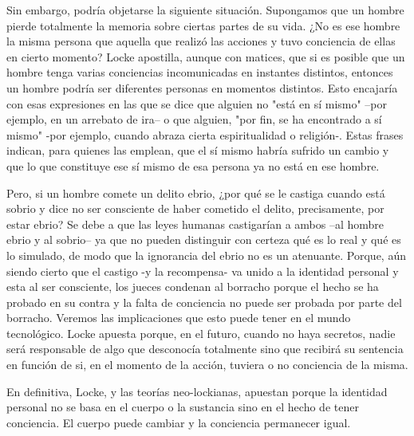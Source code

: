 \documentclass[main.tex]{subfiles}
\begin{document}
	
	Sin embargo, podría objetarse la siguiente situación. Supongamos que un hombre pierde totalmente la memoria sobre ciertas partes de su vida. ¿No es ese hombre la misma persona que aquella que realizó las acciones y tuvo conciencia de ellas en cierto momento? Locke apostilla, aunque con matices, que si es posible que un hombre tenga varias conciencias incomunicadas en instantes distintos, entonces un hombre podría ser diferentes personas en momentos distintos. Esto encajaría con esas expresiones en las que se dice que alguien no "está en sí mismo" –por ejemplo, en un arrebato de ira– o que alguien, "por fin, se ha encontrado a sí mismo" -por ejemplo, cuando abraza cierta espiritualidad o religión-. Estas frases indican, para quienes las emplean, que el sí mismo habría sufrido un cambio y que lo que constituye ese sí mismo de esa persona ya no está en ese hombre.
	
	
	Pero, si un hombre comete un delito ebrio, ¿por qué se le castiga cuando está sobrio y dice no ser consciente de haber cometido el delito, precisamente, por estar ebrio? Se debe a que las leyes humanas castigarían a ambos –al hombre ebrio y al sobrio– ya que no pueden distinguir con certeza qué es lo real y qué es lo simulado, de modo que la ignorancia del ebrio no es un atenuante. Porque, aún siendo cierto que el castigo -y la recompensa- va unido a la identidad personal y esta al ser consciente, los jueces condenan al borracho porque el hecho se ha probado en su contra y la falta de conciencia no puede ser probada por parte del borracho. Veremos las implicaciones que esto puede tener en el mundo tecnológico. Locke apuesta porque, en el futuro, cuando no haya secretos, nadie será responsable de algo que desconocía totalmente sino que recibirá su sentencia en función de si, en el momento de la acción, tuviera o no conciencia de la misma.
	
	En definitiva, Locke, y las teorías neo-lockianas, apuestan porque  la identidad personal no se basa en el cuerpo o la sustancia sino en el hecho de tener conciencia. El cuerpo puede cambiar y la conciencia permanecer igual.
	
	
\end{document}
